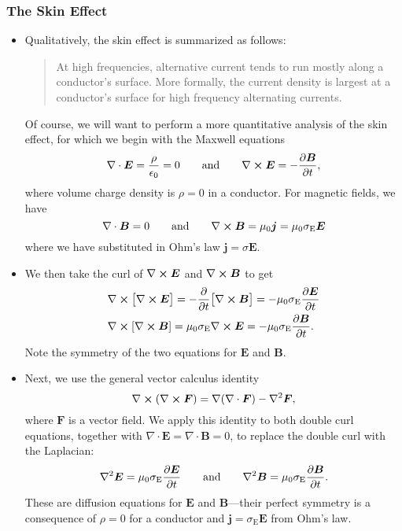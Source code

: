 \documentclass[11pt, a4paper]{article}
\newcommand{\eqtext}[1]{\qquad \text{#1} \qquad}
\renewcommand{\vec}[1]{\bm{#1}} %
\newcommand{\E}{\vec{E}} %
\newcommand{\B}{\vec{B}} %
\newcommand{\ee}{\epsilon_{0}}  %
\newcommand{\mm}{\mu_{0}}  %
\renewcommand{\j}{\vec{j}}  %
\renewcommand{\div}{\nabla \cdot}
\renewcommand{\curl}{\nabla \cross}
\renewcommand{\grad}{\nabla}
\renewcommand{\laplacian}{\nabla^{2}}
\begin{document}
\subsubsection{The Skin Effect}
\begin{itemize}
	\item Qualitatively, the skin effect is summarized as follows:
    \begin{quote}
        At high frequencies, alternative current tends to run mostly along a conductor's surface. More formally, the current density is largest at a conductor's surface for high frequency alternating currents.
    \end{quote}
	Of course, we will want to perform a more quantitative analysis of the skin effect, for which we begin with the Maxwell equations
	\begin{equation*}
		\div \E = \frac{\rho}{\ee} = 0 \eqtext{and} \curl \E = - \pdv{\B}{t},
	\end{equation*}
	where volume charge density is $ \rho = 0 $ in a conductor. For magnetic fields, we have
	\begin{equation*}
		\div \B = 0 \eqtext{and} \curl \B = \mu_{0}\j = \mm \sigma_{\text{E}} \E
	\end{equation*}
	where we have substituted in Ohm's law $ \j = \sigma \E $. 

    \item We then take the curl of $ \curl \E $ and $ \curl \B $  to get
	\begin{align*}
        & \curl \big[ \curl \E \big] = - \pdv{t}\big[ \curl \B\big] = - \mm \sigma_{\text{E}} \pdv{\E}{t}\\
        & \curl [\curl \B] = \mm \sigma_{\text{E}}\curl \E = - \mm \sigma_{\text{E}}\pdv{\B}{t}.
	\end{align*}
	Note the symmetry of the two equations for $ \E $ and $ \B $.

	
	\item Next, we use the general vector calculus identity
	\begin{equation*}
		\curl (\curl \vec{F}) = \grad (\div \vec{F}) - \laplacian \vec{F},
	\end{equation*}
    where $ \vec{F} $ is a vector field. We apply this identity to both double curl equations, together with $ \div \E = \div \B = 0 $, to replace the double curl with the Laplacian:
	\begin{equation*}
		\laplacian \E = \mm \sigma_{\text{E}}\pdv{\E}{t} \eqtext{and} \laplacian \B = \mm \sigma_{\text{E}} \pdv{\B}{t}.
	\end{equation*}
	These are diffusion equations for $ \E $ and $ \B $---their perfect symmetry is a consequence of $ \rho = 0 $ for a conductor and $ \j = \sigma_{\text{E}} \E $ from Ohm's law. 
	

\end{itemize}
\end{document}
